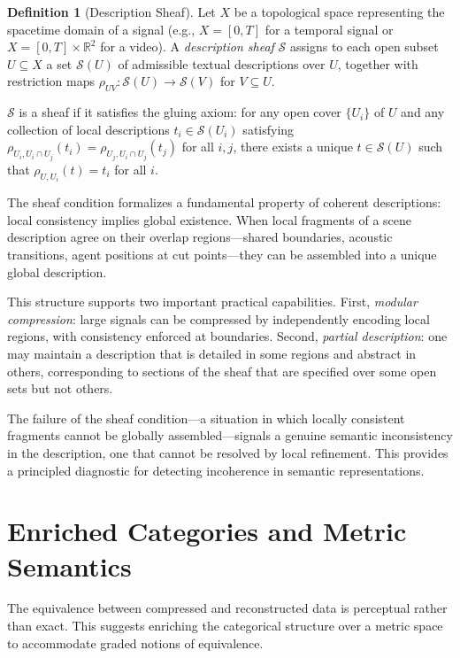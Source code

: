 \documentclass[12pt,a4paper]{article}
\theoremstyle{definition}
\newtheorem{definition}[theorem]{Definition}
\theoremstyle{remark}
\begin{document}
\begin{definition}[Description Sheaf]
Let $X$ be a topological space representing the spacetime domain of a signal (e.g., $X = [0,T]$ for a temporal signal or $X = [0,T] \times \mathbb{R}^2$ for a video). A \emph{description sheaf} $\mathcal{S}$ assigns to each open subset $U \subseteq X$ a set $\mathcal{S}(U)$ of admissible textual descriptions over $U$, together with restriction maps $\rho_{UV} : \mathcal{S}(U) \rightarrow \mathcal{S}(V)$ for $V \subseteq U$.

$\mathcal{S}$ is a sheaf if it satisfies the gluing axiom: for any open cover $\{U_i\}$ of $U$ and any collection of local descriptions $t_i \in \mathcal{S}(U_i)$ satisfying $\rho_{U_i, U_i \cap U_j}(t_i) = \rho_{U_j, U_i \cap U_j}(t_j)$ for all $i,j$, there exists a unique $t \in \mathcal{S}(U)$ such that $\rho_{U, U_i}(t) = t_i$ for all $i$.
\end{definition}

The sheaf condition formalizes a fundamental property of coherent descriptions: local consistency implies global existence. When local fragments of a scene description agree on their overlap regions---shared boundaries, acoustic transitions, agent positions at cut points---they can be assembled into a unique global description.

This structure supports two important practical capabilities. First, \emph{modular compression}: large signals can be compressed by independently encoding local regions, with consistency enforced at boundaries. Second, \emph{partial description}: one may maintain a description that is detailed in some regions and abstract in others, corresponding to sections of the sheaf that are specified over some open sets but not others.

The failure of the sheaf condition---a situation in which locally consistent fragments cannot be globally assembled---signals a genuine semantic inconsistency in the description, one that cannot be resolved by local refinement. This provides a principled diagnostic for detecting incoherence in semantic representations.

\section{Enriched Categories and Metric Semantics}
\label{sec:enriched}

The equivalence between compressed and reconstructed data is perceptual rather than exact. This suggests enriching the categorical structure over a metric space to accommodate graded notions of equivalence.
\end{document}

